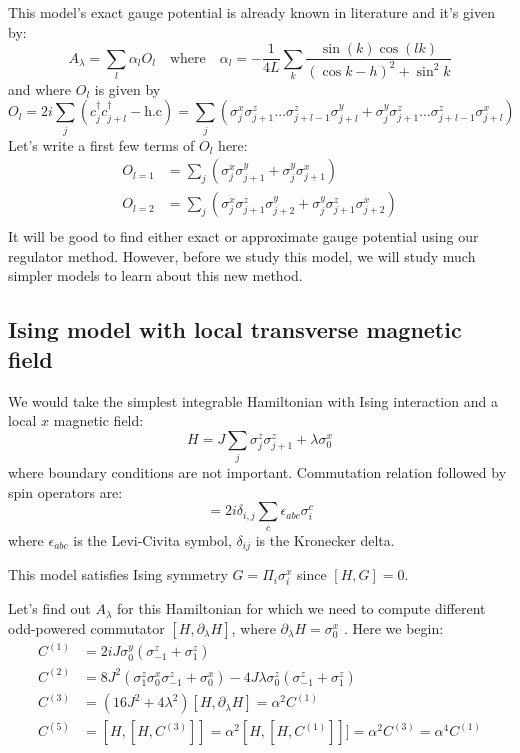 \documentclass[11pt,a4paper]{article}
\begin{document}
This model's exact gauge potential is already known in literature \cite{del2012assisted, kolodrubetz2016geometry} and it's given by:
\begin{equation}
A_{\lambda}= \sum_l \alpha_l O_l \quad \mbox{where} \quad \alpha_l= -\dfrac{1}{4 L} \sum_k \dfrac{\sin(k) \cos(lk)}{(\cos k - h)^2 + \sin^2 k}
\end{equation}
and where  $O_l$ is given by
\begin{equation}
O_l= 2 i \sum_j (c^{\dagger}_{j} c^{\dagger}_{j+l} - \mbox{h.c})= \sum_j ( \sigma_j^x \sigma_{j+1}^z \ldots \sigma_{j+l-1}^z \sigma_{j+l}^y +  \sigma_j^y \sigma_{j+1}^z \ldots \sigma_{j+l-1}^z \sigma_{j+l}^x)
\end{equation}
Let's write a first few terms of $O_l$ here:
\begin{align*}
O_{l=1}&=  \sum_j ( \sigma_j^x  \sigma_{j+1}^y +  \sigma_j^y  \sigma_{j+1}^x) \\
O_{l=2} &=  \sum_j ( \sigma_j^x \sigma_{j+1}^z \sigma_{j+2}^y +  \sigma_j^y \sigma_{j+1}^z \sigma_{j+2}^x) \\
\end{align*}
It will be good to find either exact or approximate gauge potential using our regulator method. However, before we study this model, we will study much simpler models to learn about this new method.


\subsection{Ising model with local transverse magnetic field}
We would take the simplest integrable Hamiltonian with Ising interaction and a local $x$ magnetic field:
\begin{equation}
H= J \sum_{j}  \sigma_j^z \sigma_{j+1}^z +  \lambda  \sigma_0^x
\label{zz}
\end{equation}
where boundary conditions are not important. Commutation relation followed by spin operators are:
\begin{equation}
[\sigma_i^a, \sigma_{j}^b]= 2 i   \delta_{i,j} \sum_c  \epsilon_{a b c} \sigma_i^c
\end{equation}
where $\epsilon_{abc}$ is the Levi-Civita symbol, $ \delta_{ij}$ is the Kronecker delta.

This model satisfies Ising symmetry $G= \Pi_i \sigma_i^x$ since $[H, G]=0$.


Let's find out $A_{\lambda}$ for this Hamiltonian for which we need to compute different odd-powered commutator $[H, \partial_{\lambda} H]$, where $\partial_{\lambda} H=\sigma_0^x$ . Here we begin:
\begin{align}
C^{(1)}&= 2 i J \sigma_0^y ( \sigma_{-1}^z + \sigma_1^z) \\ 
C^{(2)}&= 8 J^2(\sigma^z_1 \sigma^x_0 \sigma^z_{-1} + \sigma^x_0) - 4J \lambda \sigma_0^z( \sigma_{-1}^z + \sigma_1^z) \\
C^{(3)} &=  (16 J^2 + 4 \lambda ^2) [H, \partial_{\lambda} H] = \alpha^2  C^{(1)} \\
C^{(5)}&=[H,[H, C^{(3)}]]  = \alpha^2 [H, [H,C^{(1)}]]]=\alpha^2 C^{(3)}=  \alpha^4 C^{(1)}   
\end{align}
\end{document}
